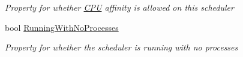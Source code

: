 \begin{DoxyCompactItemize}
\begin{DoxyCompactList}\small\item\em Property for whether \hyperlink{namespace_c_p_u___o_s___simulator_1_1_c_p_u}{C\+P\+U} affinity is allowed on this scheduler \end{DoxyCompactList}\item 
bool \hyperlink{class_c_p_u___o_s___simulator_1_1_operating___system_1_1_o_s_core_a1f01594c8f33961b5dc5ffffaf7644ce}{Running\+With\+No\+Processes}
\begin{DoxyCompactList}\small\item\em Property for whether the scheduler is running with no processes \end{DoxyCompactList}\end{DoxyCompactItemize}
